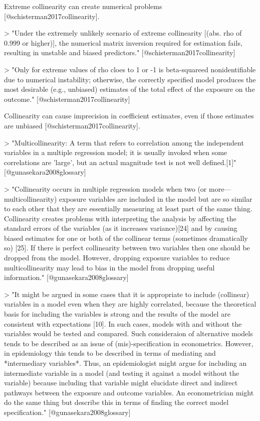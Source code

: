 Extreme collinearity can create numerical problems
[@schisterman2017collinearity].

> "Under the extremely unlikely scenario of extreme collinearity [(abs. rho of
0.999 or higher)], the numerical matrix inversion required for estimation fails,
resulting in unstable and biased predictors." [@schisterman2017collinearity]

> "Only for extreme values of rho cloes to 1 or -1 is beta-squareed
nonidentifiable due to numerical instability; otherwise, the correctly specified
model produces the most desirable (e.g., unbiased) estimates of the total effect
of the exposure on the outcome." [@schisterman2017collinearity]

Collinearity can cause imprecision in coefficient estimates, even if those
estimates are unbiased [@schisterman2017collinearity].

> "Multicollinearity: A term that refers to correlation among the independent
variables in a multiple regression model; it is usually invoked when some 
correlations are 'large', but an actual magnitude test is not well defined.[1]"
[@gunasekara2008glossary]

> "Collinearity occurs in multiple regression models when two (or
more---multicollinearity) exposure variables are included in the model but are
so similar to each other that they are essentially measuring at least part of
the same thing. Collinearity creates problems with interpreting the analysis by
affecting the standard errors of the variables (as it increases variance)[24]
and by causing biased estimates for one or both of the collinear terms
(sometimes dramatically so) [25]. If there is perfect collinearity between two
variables then one should be dropped from the model. However, dropping exposure
variables to reduce multicollinearity may lead to bias in the model from
dropping useful information." [@gunasekara2008glossary]

> "It might be argued in some cases that it is appropriate to include
(collinear) variables in a model even when they are highly correlated, because
the theoretical basis for including the variables is strong and the results of
the model are consistent with expectations [10]. In such cases, models with and
without the variables would be tested and compared. Such consideraion of
alternative models tends to be described as an issue of (mis)-specification in
econometrics. However, in epidemiology this tends to be described in terms of
mediating and *intermediary variables*. Thus, an epidemiologist might argue for
including an intermediate variable in a model (and testing it against a model
without the variable) because including that variable might elucidate direct and
indirect pathways between the exposure and outcome variables. An econometrician
might do the same thing but describe this in terms of finding the correct model
specification." [@gunasekara2008glossary]

